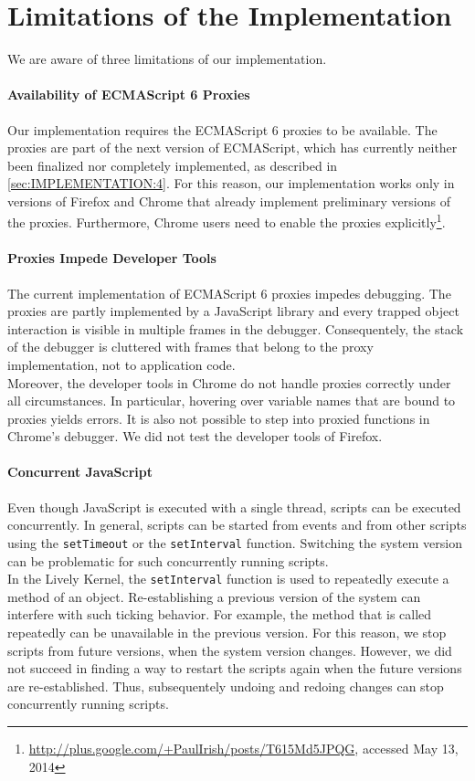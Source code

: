 \section{Limitations of the Implementation}

We are aware of three limitations of our implementation.

\paragraph{Availability of ECMAScript 6 Proxies}
Our implementation requires the ECMAScript 6 proxies to be available.
The proxies are part of the next version of ECMAScript, which has currently neither been finalized nor completely implemented, as described in \ref{sec:IMPLEMENTATION:4}.
For this reason, our implementation works only in versions of Firefox and Chrome that already implement preliminary versions of the proxies.
Furthermore, Chrome users need to enable the proxies explicitly\footnote{\url{http://plus.google.com/+PaulIrish/posts/T615Md5JPQG}, accessed May 13, 2014}.

\paragraph{Proxies Impede Developer Tools}
The current implementation of ECMAScript 6 proxies impedes debugging.
The proxies are partly implemented by a JavaScript library and every trapped object interaction is visible in multiple frames in the debugger.
Consequentely, the stack of the debugger is cluttered with frames that belong to the proxy implementation, not to application code.\\
Moreover, the developer tools in Chrome do not handle proxies correctly under all circumstances.
In particular, hovering over variable names that are bound to proxies yields errors.
It is also not possible to step into proxied functions in Chrome's debugger.
We did not test the developer tools of Firefox.

\paragraph{Concurrent JavaScript}
Even though JavaScript is executed with a single thread, scripts can be executed concurrently.
In general, scripts can be started from events and from other scripts using the \lstinline{setTimeout} or the \lstinline{setInterval} function.
Switching the system version can be problematic for such concurrently running scripts.\\
In the Lively Kernel, the \lstinline{setInterval} function is used to repeatedly execute a method of an object.
Re-establishing a previous version of the system can interfere with such ticking behavior.
For example, the method that is called repeatedly can be unavailable in the previous version.
For this reason, we stop scripts from future versions, when the system version changes.
However, we did not succeed in finding a way to restart the scripts again when the future versions are re-established.
Thus, subsequentely undoing and redoing changes can stop concurrently running scripts.
